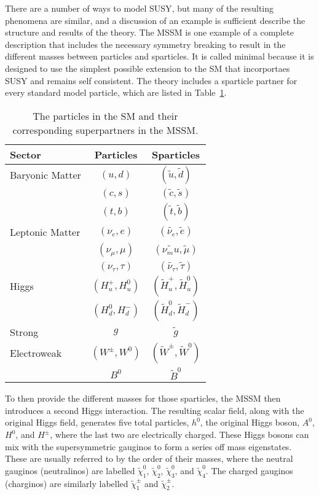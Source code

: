 There are a number of ways to model \ac{SUSY}, but many of the resulting phenomena are similar, and a discussion of an example is sufficient describe the structure and results of the theory.
The \ac{MSSM} is one example of a complete description that includes the necessary symmetry breaking to result in the different masses between particles and sparticles.
It is called minimal because it is designed to use the simplest possible extension to the \ac{SM} that incorportaes \ac{SUSY} and remains self consistent.
The theory includes a sparticle partner for every standard model particle, which are listed in Table~\ref{tab:sparticles}.

\begin{table}
\centering
\begin{tabular}{lcc}
\hline
Sector & Particles & Sparticles \\
\hline
Baryonic Matter & $(u,d)$ & $(\tilde{u},\tilde{d})$ \\
                & $(c,s)$ & $(\tilde{c},\tilde{s})$ \\
                & $(t,b)$ & $(\tilde{t},\tilde{b})$ \\
Leptonic Matter & $(\nu_e,e)$ & $(\tilde{\nu_e},\tilde{e})$ \\
                & $(\nu_\mu,\mu)$ & $(\tilde{\nu_mu},\tilde{\mu})$ \\
                & $(\nu_\tau,\tau)$ & $(\tilde{\nu_\tau},\tilde{\tau})$ \\
Higgs           & $(H_u^+, H_u^0)$ & $(\tilde{H}_u^+, \tilde{H}_u^0)$ \\
                & $(H_d^0, H_d^-)$ & $(\tilde{H}_d^0, \tilde{H}_d^-)$ \\
Strong          & $g$ & $\tilde{g}$ \\
Electroweak     & $(W^\pm, W^0)$ & $(\tilde{W}^\pm, \tilde{W}^0)$ \\
                & $B^0$ & $\tilde{B}^0$ \\
\end{tabular}
\caption{The particles in the \ac{SM} and their corresponding superpartners in the \ac{MSSM}.}
\label{tab:sparticles}
\end{table}

To then provide the different masses for those sparticles, the \ac{MSSM} then introduces a second Higgs interaction.
The resulting scalar field, along with the original Higgs field, generates five total particles, $h^0$, the original Higgs boson, $A^0$, $H^0$, and $H^\pm$, where the last two are electrically charged.
These Higgs bosons can mix with the supersymmetric gauginos to form a series off mass eigenstates.
These are usually referred to by the order of their masses, where the neutral gauginos (neutralinos) are labelled $\tilde{\chi}_1^0$, $\tilde{\chi}_2^0$, $\tilde{\chi}_3^0$, and $\tilde{\chi}_4^0$. 
The charged gauginos (charginos) are similarly labelled $\tilde{\chi}_1^\pm$ and $\tilde{\chi}_2^\pm$. 

